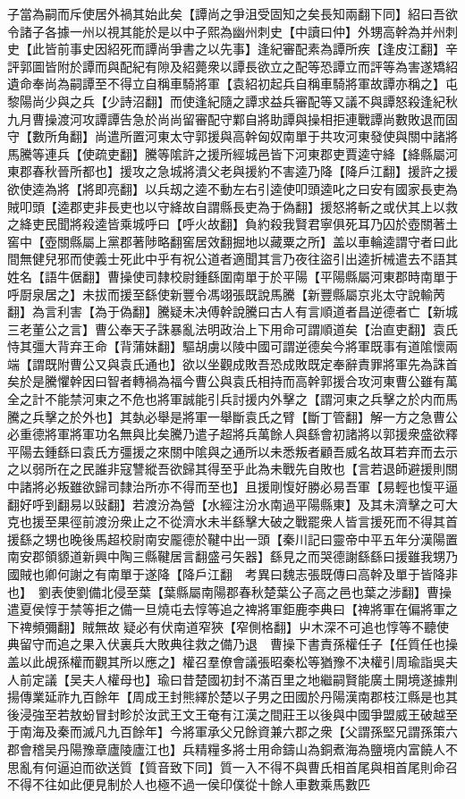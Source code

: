 子當為嗣而斥使居外禍其始此矣【譚尚之爭沮受固知之矣長知兩翻下同】紹曰吾欲令諸子各據一州以視其能於是以中子熙為幽州刺史【中讀曰仲】外甥高幹為并州刺史【此皆前事史因紹死而譚尚爭書之以先事】逢紀審配素為譚所疾【逢皮江翻】辛評郭圖皆附於譚而與配紀有隙及紹薨衆以譚長欲立之配等恐譚立而評等為害遂矯紹遺命奉尚為嗣譚至不得立自稱車騎將軍【袁紹初起兵自稱車騎將軍故譚亦稱之】屯黎陽尚少與之兵【少詩沼翻】而使逢紀隨之譚求益兵審配等又議不與譚怒殺逢紀秋九月曹操渡河攻譚譚告急於尚尚留審配守鄴自將助譚與操相拒連戰譚尚數敗退而固守【數所角翻】尚遣所置河東太守郭援與高幹匈奴南單于共攻河東發使與關中諸將馬騰等連兵【使疏吏翻】騰等隂許之援所經城邑皆下河東郡吏賈逵守絳【絳縣屬河東郡春秋晉所都也】援攻之急城將潰父老與援約不害逵乃降【降戶江翻】援許之援欲使逵為將【將即亮翻】以兵刼之逵不動左右引逵使叩頭逵叱之曰安有國家長吏為賊叩頭【逵郡吏非長吏也以守絳故自謂縣長吏為于偽翻】援怒將斬之或伏其上以救之絳吏民聞將殺逵皆乘城呼曰【呼火故翻】負約殺我賢君寧俱死耳乃囚於壺關著土窖中【壺關縣屬上黨郡著陟略翻窖居效翻掘地以藏粟之所】盖以車輪逵謂守者曰此間無健兒邪而使義士死此中乎有祝公道者適聞其言乃夜往盜引出逵折械遣去不語其姓名【語牛倨翻】曹操使司隸校尉鍾繇圍南單于於平陽【平陽縣屬河東郡時南單于呼㕑泉居之】未拔而援至繇使新豐令馮翊張既說馬騰【新豐縣屬京兆太守說輸苪翻】為言利害【為于偽翻】騰疑未决傅幹說騰曰古人有言順道者昌逆德者亡【新城三老董公之言】曹公奉天子誅暴亂法明政治上下用命可謂順道矣【治直吏翻】袁氏恃其彊大背弃王命【背蒲妹翻】驅胡虜以陵中國可謂逆德矣今將軍既事有道隂懷兩端【謂既附曹公又與袁氏通也】欲以坐觀成敗吾恐成敗既定奉辭責罪將軍先為誅首矣於是騰懼幹因曰智者轉禍為福今曹公與袁氏相持而高幹郭援合攻河東曹公雖有萬全之計不能禁河東之不危也將軍誠能引兵討援内外擊之【謂河東之兵擊之於内而馬騰之兵擊之於外也】其埶必舉是將軍一舉斷袁氏之臂【斷丁管翻】解一方之急曹公必重德將軍將軍功名無與比矣騰乃遣子超將兵萬餘人與繇會初諸將以郭援衆盛欲釋平陽去鍾繇曰袁氏方彊援之來關中隂與之通所以未悉叛者顧吾威名故耳若弃而去示之以弱所在之民誰非寇讐縱吾欲歸其得至乎此為未戰先自敗也【言若退師避援則關中諸將必叛雖欲歸司隸治所亦不得而至也】且援剛愎好勝必易吾軍【易輕也愎平逼翻好呼到翻易以䜴翻】若渡汾為營【水經注汾水南過平陽縣東】及其未濟擊之可大克也援至果徑前渡汾衆止之不從濟水未半繇擊大破之戰罷衆人皆言援死而不得其首援繇之甥也晚後馬超校尉南安龎德於鞬中出一頭【秦川記曰靈帝中平五年分漢陽置南安郡領䝠道新興中陶三縣鞬居言翻盛弓矢器】繇見之而哭德謝繇繇曰援雖我甥乃國賊也卿何謝之有南單于遂降【降戶江翻　考異曰魏志張既傳曰高幹及單于皆降非也】　劉表使劉備北侵至葉【葉縣屬南陽郡春秋楚葉公子高之邑也葉之涉翻】曹操遣夏侯惇于禁等拒之備一旦燒屯去惇等追之禆將軍鉅鹿李典曰【禆將軍在偏將軍之下禆頻彌翻】賊無故疑必有伏南道窄狹【窄側格翻】屮木深不可追也惇等不聽使典留守而追之果入伏裏兵大敗典往救之備乃退　曹操下書責孫權任子【任質任也操盖以此覘孫權而觀其所以應之】權召羣僚會議張昭秦松等猶豫不决權引周瑜詣吳夫人前定議【吴夫人權母也】瑜曰昔楚國初封不滿百里之地繼嗣賢能廣土開境遂據荆揚傳業延祚九百餘年【周成王封熊繹於楚以子男之田國於丹陽漢南郡枝江縣是也其後浸強至若敖蚡冒封畛於汝武王文王奄有江漢之間莊王以後與中國爭盟威王破越至于南海及秦而滅凡九百餘年】今將軍承父兄餘資兼六郡之衆【父謂孫堅兄謂孫策六郡會稽吴丹陽豫章廬陵廬江也】兵精糧多將士用命鑄山為銅煮海為鹽境内富饒人不思亂有何逼迫而欲送質【質音致下同】質一入不得不與曹氏相首尾與相首尾則命召不得不往如此便見制於人也極不過一侯印僕從十餘人車數乘馬數匹